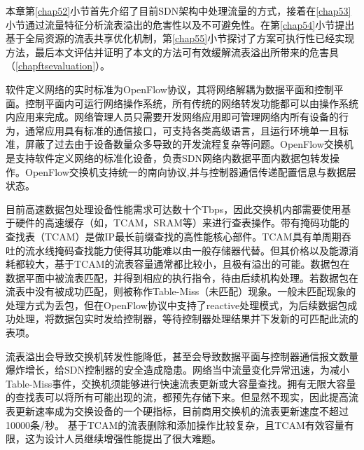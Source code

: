 
\label{chap5}


\label{chap51}

本章第\ref{chap52}小节首先介绍了目前SDN架构中处理流量的方式，接着在\ref{chap53}小节通过流量特征分析流表溢出的危害性以及不可避免性。在第\ref{chap54}小节提出基于全局资源的流表共享优化机制，第\ref{chap55}小节探讨了方案可执行性已经实现方法，最后本文评估并证明了本文的方法可有效缓解流表溢出所带来的危害具（\ref{chapftsevaluation}）。

\label{chap52}

软件定义网络的实时标准为OpenFlow协议，其将网络解耦为数据平面和控制平面。控制平面内可运行网络操作系统，所有传统的网络转发功能都可以由操作系统内应用来完成。网络管理人员只需要开发网络应用即可管理网络内所有设备的行为，通常应用具有标准的通信接口，可支持各类高级语言，且运行环境单一且标准，屏蔽了过去由于设备数量众多导致的开发流程复杂等问题。OpenFlow交换机是支持软件定义网络的标准化设备，负责SDN网络内数据平面内数据包转发操作。OpenFlow交换机支持统一的南向协议,并与控制器通信传递配置信息与数据层状态。

目前高速数据包处理设备性能需求可达数十个Tbps，因此交换机内部需要使用基于硬件的高速缓存（如，TCAM，SRAM等）来进行查表操作。带有掩码功能的查找表（TCAM）是做IP最长前缀查找的高性能核心部件。TCAM具有单周期吞吐的流水线掩码查找能力使得其功能难以由一般存储器代替。但其价格以及能源消耗都较大，基于TCAM的流表容量通常都比较小，且极有溢出的可能。数据包在数据平面中被流表匹配，并得到相应的执行指令，待由后续机构处理。若数据包在流表中没有被成功匹配，则被称作Table-Miss（未匹配）现象。一般未匹配现象的处理方式为丢包，但在OpenFlow协议中支持了reactive处理模式，为后续数据包成功处理，将数据包实时发给控制器，等待控制器处理结果并下发新的可匹配此流的表项。

流表溢出会导致交换机转发性能降低，甚至会导致数据平面与控制器通信报文数量爆炸增长，给SDN控制器的安全造成隐患。网络当中流量变化异常迅速，为减小Table-Miss事件，交换机须能够进行快速流表更新或大容量查找。拥有无限大容量的查找表可以将所有可能出现的流，都预先存储下来。但显然不现实，因此提高流表更新速率成为交换设备的一个硬指标，目前商用交换机的流表更新速度不超过10000条/秒。
基于TCAM的流表删除和添加操作比较复杂，且TCAM有效容量有限，这为设计人员继续增强性能提出了很大难题。

